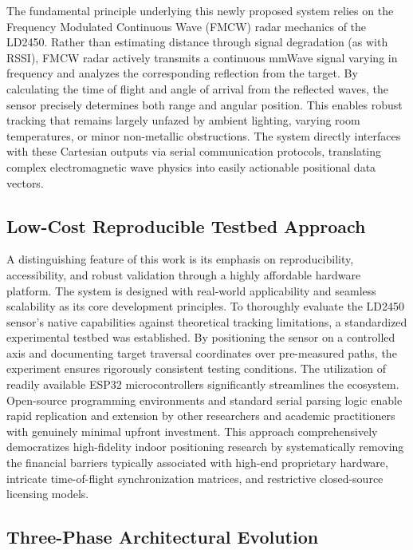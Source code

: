 The fundamental principle underlying this newly proposed system relies on the Frequency Modulated Continuous Wave (FMCW) radar mechanics of the LD2450. Rather than estimating distance through signal degradation (as with RSSI), FMCW radar actively transmits a continuous mmWave signal varying in frequency and analyzes the corresponding reflection from the target. By calculating the time of flight and angle of arrival from the reflected waves, the sensor precisely determines both range and angular position. This enables robust tracking that remains largely unfazed by ambient lighting, varying room temperatures, or minor non-metallic obstructions. The system directly interfaces with these Cartesian outputs via serial communication protocols, translating complex electromagnetic wave physics into easily actionable positional data vectors.\par

\subsection{Low-Cost Reproducible Testbed Approach}

A distinguishing feature of this work is its emphasis on reproducibility, accessibility, and robust validation through a highly affordable hardware platform. The system is designed with real-world applicability and seamless scalability as its core development principles. To thoroughly evaluate the LD2450 sensor's native capabilities against theoretical tracking limitations, a standardized experimental testbed was established. By positioning the sensor on a controlled axis and documenting target traversal coordinates over pre-measured paths, the experiment ensures rigorously consistent testing conditions. The utilization of readily available ESP32 microcontrollers significantly streamlines the ecosystem. Open-source programming environments and standard serial parsing logic enable rapid replication and extension by other researchers and academic practitioners with genuinely minimal upfront investment. This approach comprehensively democratizes high-fidelity indoor positioning research by systematically removing the financial barriers typically associated with high-end proprietary hardware, intricate time-of-flight synchronization matrices, and restrictive closed-source licensing models.\par

\subsection{Three-Phase Architectural Evolution}

